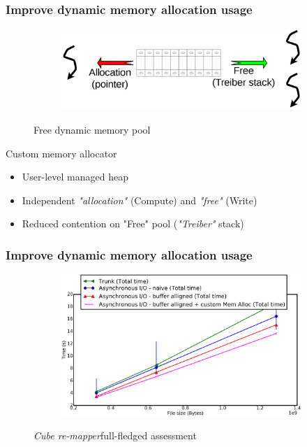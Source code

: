 \documentclass[slidestop,xcolor=dvipsnames, notes=hide]{beamer}
\newcommand{\toolTargetSoftware}			{\emph{Cube re-mapper}}
\begin{document}
		\begin{frame}
			\frametitle{Improve dynamic memory allocation usage}
			\begin{figure}[!h]
				\centering
				\begin{subfigure}[b]{0.7\textwidth}
					\centering
					\includegraphics[width=\textwidth]{images/internship_juelich_customMemAlloc_freePool.png}
				\end{subfigure}
				\caption[Free dynamic memory pool]
				{\small Free dynamic memory pool}
			\end{figure}

			\begin{block}{Custom memory allocator}
			\begin{itemize}
				\item User-level managed heap
				\item Independent \emph{"allocation"} (Compute) and \emph{"free"} (Write)
				\item Reduced contention on "Free" pool (\emph{"Treiber"} stack)
			\end{itemize}
			\end{block}
		\end{frame}


		\begin{frame}
			\frametitle{Improve dynamic memory allocation usage}
			\begin{figure}[!h]
				\centering
				\begin{subfigure}[b]{0.8\textwidth}
					\centering
					\includegraphics[width=\textwidth]{images/cubeRemapper_customMemAlloc_overall_time_hpc.png}
				\end{subfigure}
				\caption{\toolTargetSoftware\space full-fledged assessment}
			\end{figure}
		\end{frame}
\end{document}
